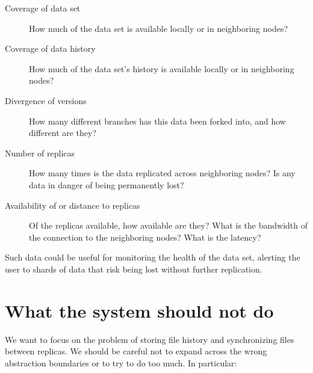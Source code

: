 \begin{description}

  \item[Coverage of data set] How much of the data set is available locally or
    in neighboring nodes?

  \item[Coverage of data history] How much of the data set's history is
    available locally or in neighboring nodes?

  \item[Divergence of versions] How many different branches has this data been
    forked into, and how different are they?

  \item[Number of replicas] How many times is the data replicated across
    neighboring nodes? Is any data in danger of being permanently lost?

  \item[Availability of or distance to replicas] Of the replicas available, how
    available are they? What is the bandwidth of the connection to the
    neighboring nodes? What is the latency?

\end{description}

Such data could be useful for monitoring the health of the data set, alerting
the user to shards of data that risk being lost without further replication.


%


\section{What the system should not do}

We want to focus on the problem of storing file history and synchronizing files
between replicas.
We should be careful not to expand across the wrong abstraction boundaries or to
try to do too much.
In particular:

